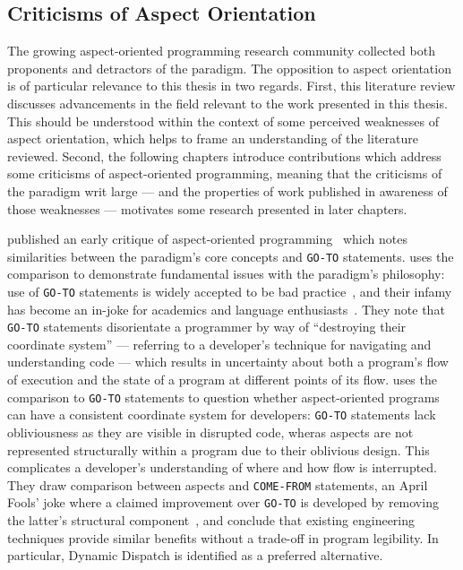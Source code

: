 \subsection{Criticisms of Aspect Orientation}\label{subsec:aop-criticisms}

The growing aspect-oriented programming research community collected both
proponents and detractors of the paradigm. The opposition to
aspect orientation is of particular relevance to this thesis in two regards. First, this literature review discusses advancements in the field relevant to
the work presented in this thesis. This should be understood within the context
of some perceived weaknesses of aspect orientation, which helps to frame an
understanding of the literature reviewed. Second, the following chapters
introduce contributions which address some criticisms of aspect-oriented
programming, meaning that the criticisms of the paradigm writ large --- and the
properties of work published in awareness of those weaknesses --- motivates some
research presented in later chapters.


\citeauthor{Constantinides04aopconsidered} published an early critique of
aspect-oriented programming~\cite{Constantinides04aopconsidered} which notes
similarities between the paradigm's core concepts and \lstinline{GO-TO}
statements. \citeauthor{Constantinides04aopconsidered} uses the comparison to
demonstrate fundamental issues with the paradigm's philosophy: use of
\lstinline{GO-TO} statements is widely accepted to be bad
practice~\cite{dijkstra1968letters}, and their infamy has become an in-joke for
academics and language enthusiasts~\cite{clark73comefrom}. They note that
\lstinline{GO-TO} statements disorientate a programmer by way of ``destroying
their coordinate system'' --- referring to a developer's technique for
navigating and understanding code --- which results in uncertainty about both a
program's flow of execution and the state of a program at different points of
its flow. \citeauthor{Constantinides04aopconsidered} uses the comparison to
\lstinline{GO-TO} statements to question whether aspect-oriented programs can
have a consistent coordinate system for developers: \lstinline{GO-TO} statements
lack obliviousness as they are visible in disrupted code, wheras aspects are not
represented structurally within a program due to their oblivious design. This
complicates a developer's understanding of where and how flow is interrupted.
They draw comparison between aspects and \lstinline{COME-FROM} statements, an
April Fools' joke where a claimed improvement over \lstinline{GO-TO} is
developed by removing the latter's structural component~\cite{clark73comefrom},
and conclude that existing engineering techniques provide similar benefits
without a trade-off in program legibility. In particular, Dynamic Dispatch is
identified as a preferred alternative.


